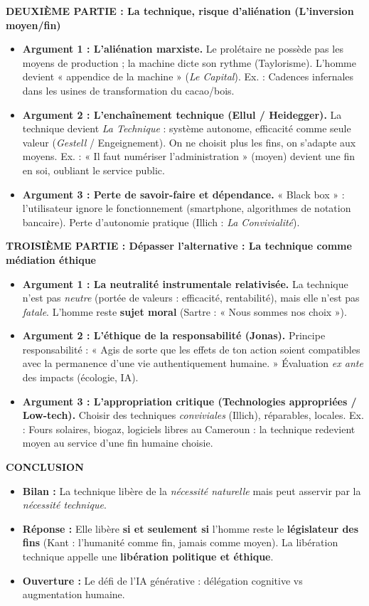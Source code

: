 \documentclass[11pt]{article}
\begin{document}
\begin{exoresolu}
\textbf{DEUXIÈME PARTIE : La technique, risque d'aliénation (L'inversion moyen/fin)}
\begin{itemize}
    \item \textbf{Argument 1 : L'aliénation marxiste.} Le prolétaire ne possède pas les moyens de production ; la machine dicte son rythme (Taylorisme). L'homme devient « appendice de la machine » (\emph{Le Capital}). Ex. : Cadences infernales dans les usines de transformation du cacao/bois.
    \item \textbf{Argument 2 : L'enchaînement technique (Ellul / Heidegger).} La technique devient \emph{La Technique} : système autonome, efficacité comme seule valeur (\emph{Gestell} / Engeignement). On ne choisit plus les fins, on s'adapte aux moyens. Ex. : « Il faut numériser l'administration » (moyen) devient une fin en soi, oubliant le service public.
    \item \textbf{Argument 3 : Perte de savoir-faire et dépendance.} « Black box » : l'utilisateur ignore le fonctionnement (smartphone, algorithmes de notation bancaire). Perte d'autonomie pratique (Illich : \emph{La Convivialité}).
\end{itemize}

\textbf{TROISIÈME PARTIE : Dépasser l'alternative : La technique comme médiation éthique}
\begin{itemize}
    \item \textbf{Argument 1 : La neutralité instrumentale relativisée.} La technique n'est pas \emph{neutre} (portée de valeurs : efficacité, rentabilité), mais elle n'est pas \emph{fatale}. L'homme reste \textbf{sujet moral} (Sartre : « Nous sommes nos choix »).
    \item \textbf{Argument 2 : L'éthique de la responsabilité (Jonas).} Principe responsabilité : « Agis de sorte que les effets de ton action soient compatibles avec la permanence d'une vie authentiquement humaine. » Évaluation \emph{ex ante} des impacts (écologie, IA).
    \item \textbf{Argument 3 : L'appropriation critique (Technologies appropriées / Low-tech).} Choisir des techniques \emph{conviviales} (Illich), réparables, locales. Ex. : Fours solaires, biogaz, logiciels libres au Cameroun : la technique redevient moyen au service d'une fin humaine choisie.
\end{itemize}

\textbf{CONCLUSION}
\begin{itemize}
    \item \textbf{Bilan :} La technique libère de la \emph{nécessité naturelle} mais peut asservir par la \emph{nécessité technique}.
    \item \textbf{Réponse :} Elle libère \textbf{si et seulement si} l'homme reste le \textbf{législateur des fins} (Kant : l'humanité comme fin, jamais comme moyen). La libération technique appelle une \textbf{libération politique et éthique}.
    \item \textbf{Ouverture :} Le défi de l'IA générative : délégation cognitive vs augmentation humaine.
\end{itemize}
\end{exoresolu}
\end{document}
